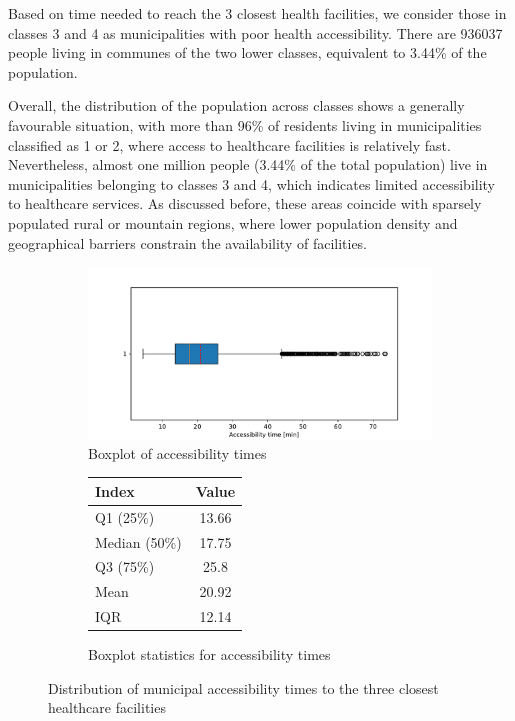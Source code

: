 Based on time needed to reach the 3 closest health facilities, we consider those in classes 3 and 4 as municipalities with poor health accessibility.
There are 936037 people living in communes of the two lower classes, equivalent to 3.44\% of the population.

Overall, the distribution of the population across classes shows a generally favourable situation, with more than 96\% of residents living in municipalities classified as 1 or 2, where access to healthcare facilities is relatively fast.
Nevertheless, almost one million people (3.44\% of the total population) live in municipalities belonging to classes 3 and 4, which indicates limited accessibility to healthcare services. 
As discussed before, these areas coincide with sparsely populated rural or mountain regions, where lower population density and geographical barriers constrain the availability of facilities.


\begin{figure}[tbp]
	\centering
	\begin{subfigure}{\textwidth}
		\centering
		\includegraphics[width=0.8\linewidth]{img/boxplot_acc_by_comm_2023n3.pdf}
		\caption{Boxplot of accessibility times}
		\label{boxplot:acc_by_comm_2023n3}
	\end{subfigure}
	\medskip
	
	\begin{subfigure}{\textwidth}
		\centering
		\begin{tabular}{l S[table-alignment-mode=marker]}
			\toprule
			\textbf{Index} & \textbf{Value}\\
			\midrule
			Q1 (25\%) & 13.66\\
			Median (50\%) & 17.75\\
			Q3 (75\%) & 25.8\\
			Mean & 20.92\\
			IQR & 12.14\\
			\bottomrule
		\end{tabular}
		\caption{Boxplot statistics for accessibility times}
		\label{tab:boxplot_idxs}
	\end{subfigure}
	
	\caption{Distribution of municipal accessibility times to the three closest healthcare facilities}
\end{figure}


